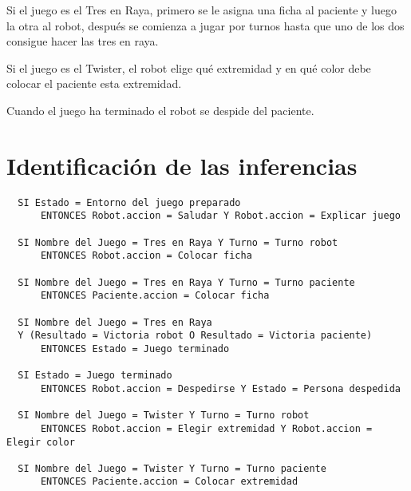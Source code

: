 \documentclass{uc3mpracticas}
\begin{document}
  \vspace{2mm}

  Si el juego es el Tres en Raya, primero se le asigna una ficha al paciente y luego la otra al robot, después se comienza a jugar por turnos hasta que uno de los dos consigue hacer las tres en raya.

  \vspace{2mm}

  Si el juego es el Twister, el robot elige qué extremidad y en qué color debe colocar el paciente esta extremidad.

  \vspace{2mm}

  Cuando el juego ha terminado el robot se despide del paciente.


  \section{Identificación de las inferencias}

  \begin{lstlisting}
  SI Estado = Entorno del juego preparado
      ENTONCES Robot.accion = Saludar Y Robot.accion = Explicar juego

  SI Nombre del Juego = Tres en Raya Y Turno = Turno robot
      ENTONCES Robot.accion = Colocar ficha

  SI Nombre del Juego = Tres en Raya Y Turno = Turno paciente
      ENTONCES Paciente.accion = Colocar ficha

  SI Nombre del Juego = Tres en Raya
  Y (Resultado = Victoria robot O Resultado = Victoria paciente)
      ENTONCES Estado = Juego terminado

  SI Estado = Juego terminado
      ENTONCES Robot.accion = Despedirse Y Estado = Persona despedida

  SI Nombre del Juego = Twister Y Turno = Turno robot
      ENTONCES Robot.accion = Elegir extremidad Y Robot.accion = Elegir color

  SI Nombre del Juego = Twister Y Turno = Turno paciente
      ENTONCES Paciente.accion = Colocar extremidad

  \end{lstlisting}
\end{document}
